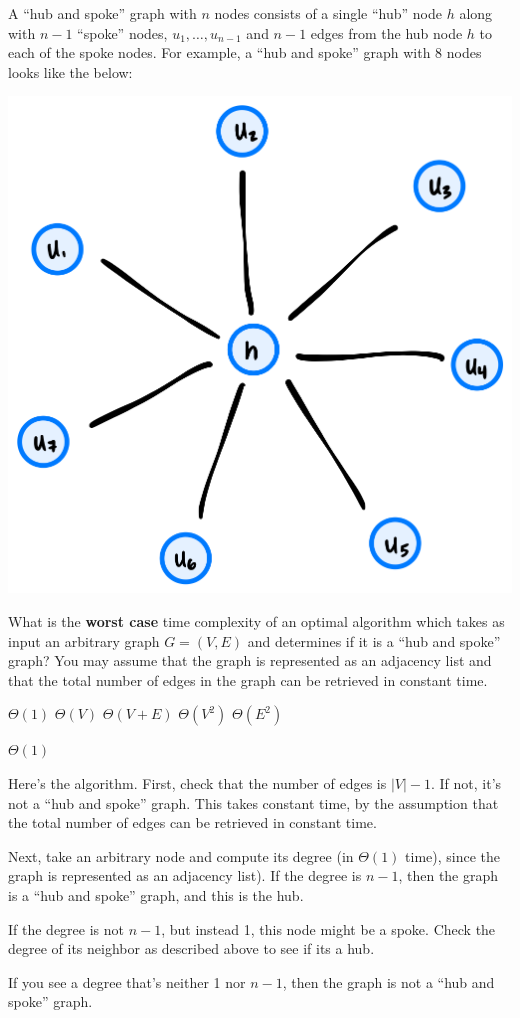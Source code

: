 \begin{prob}
    A ``hub and spoke'' graph with $n$ nodes consists of a single ``hub'' node $h$
    along with $n - 1$ ``spoke'' nodes, $u_1, \ldots, u_{n-1}$ and $n - 1$
    edges from the hub node $h$ to each of the spoke nodes. For example, a ``hub and
    spoke'' graph with 8 nodes looks like the below:

    \includegraphics[width=.5\textwidth]{./g5.png}

    What is the \textbf{worst case} time complexity of an optimal algorithm
    which takes as input an arbitrary graph $G = (V, E)$ and determines if it
    is a ``hub and spoke'' graph? You may assume that the graph is represented as
    an adjacency list and that the total number of edges in the graph can be retrieved
    in constant time.

    \begin{choices}
        \correctchoice $\Theta(1)$
        \choice $\Theta(V)$
        \choice $\Theta(V + E)$
        \choice $\Theta(V^2)$
        \choice $\Theta(E^2)$
    \end{choices}

    \begin{soln}
        $\Theta(1)$

        Here's the algorithm. First, check that the number of edges is $|V| - 1$. If not, it's not a ``hub and spoke'' graph.
        This takes constant time, by the assumption that the total number of edges can be retrieved in constant time.

        Next, take an arbitrary node and compute its degree (in $\Theta(1)$ time), since
        the graph is represented as an adjacency list). If the degree is $n - 1$, then the graph is a
        ``hub and spoke'' graph, and this is the hub.

        If the degree is not $n - 1$, but instead 1, this node might be a spoke. Check the degree of its
        neighbor as described above to see if its a hub.

        If you see a degree that's neither 1 nor $n - 1$, then the graph is not a ``hub and spoke'' graph.
    \end{soln}

\end{prob}

